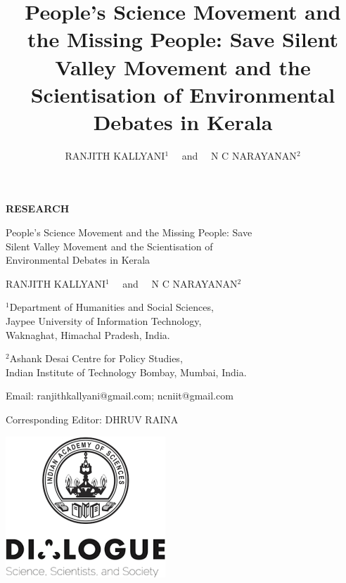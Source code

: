 \documentclass[twoside, 13pt]{article}
\title{People’s Science Movement and the Missing People: Save Silent Valley Movement and the Scientisation of Environmental Debates in Kerala}
\author{{\fontsize{14}{16}\selectfont RANJITH KALLYANI$^{1}$~~ and~~ N C NARAYANAN$^{2}$}}
\date{}
\begin{document}
  
  
{\begin{titlepage}
   \begin{center}
   {\fontsize{14}{16}\selectfont
   {\large\textbf{RESEARCH}}}
   
       \vspace*{1cm}
      {\fontsize{24}{26}\selectfont
       {\LARGE People’s Science Movement and the Missing People: Save\\ Silent Valley Movement and the Scientisation of\\[0.2cm] Environmental Debates in Kerala}
}
       \vspace{0.7cm}
                
{\fontsize{14}{16}\selectfont
       {\large RANJITH KALLYANI$^{1}$~~ and~~ N C NARAYANAN$^{2}$}}

       \vspace{0.5cm}
       {\fontsize{14}{16}\selectfont     
      $^{1}$Department of Humanities and Social Sciences,\\ Jaypee University of Information Technology,\\ Waknaghat, Himachal Pradesh, India.
       
       $^{2}$Ashank Desai Centre for Policy Studies,\\ Indian Institute of Technology Bombay, Mumbai, India.
       
       \vspace{0.5cm}
       
       \begin{center}
		Email: ranjithkallyani@gmail.com; ncniit@gmail.com 
		\end{center}
		
		\vspace{.5cm}
		Corresponding Editor: DHRUV RAINA
		
		
		}
     
     \vfill
       \includegraphics{image/001.jpg}           
            
   \end{center}
\end{titlepage}}
\end{document}
